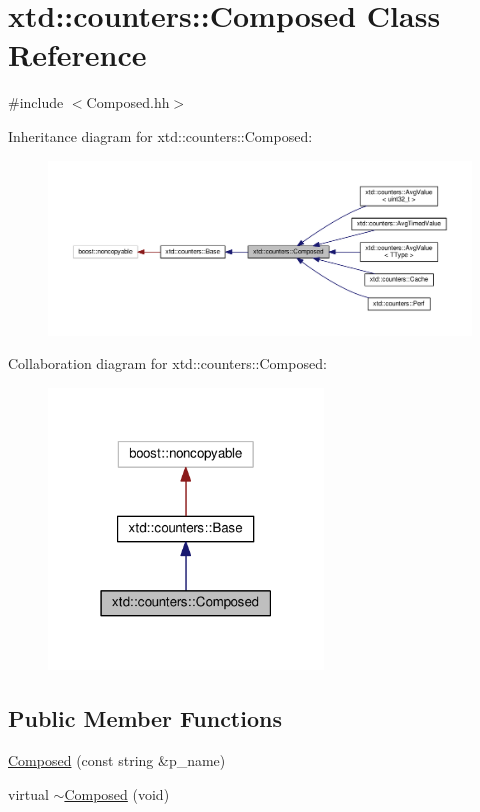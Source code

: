 \hypertarget{classxtd_1_1counters_1_1Composed}{}\section{xtd\+:\+:counters\+:\+:Composed Class Reference}
\label{classxtd_1_1counters_1_1Composed}


{\ttfamily \#include $<$Composed.\+hh$>$}



Inheritance diagram for xtd\+:\+:counters\+:\+:Composed\+:
\nopagebreak
\begin{figure}[H]
\begin{center}
\leavevmode
\includegraphics[width=350pt]{classxtd_1_1counters_1_1Composed__inherit__graph}
\end{center}
\end{figure}


Collaboration diagram for xtd\+:\+:counters\+:\+:Composed\+:
\nopagebreak
\begin{figure}[H]
\begin{center}
\leavevmode
\includegraphics[width=207pt]{classxtd_1_1counters_1_1Composed__coll__graph}
\end{center}
\end{figure}
\subsection*{Public Member Functions}
\begin{DoxyCompactItemize}
\item 
\hyperlink{classxtd_1_1counters_1_1Composed_ad604f1fcd711f6df3c0bca1f07956fe8}{Composed} (const string \&p\+\_\+name)
\item 
virtual \hyperlink{classxtd_1_1counters_1_1Composed_a28b2cf984f727ae3278464e06b03fad7}{$\sim$\+Composed} (void)
\end{DoxyCompactItemize}

